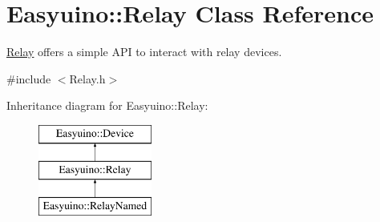 \hypertarget{class_easyuino_1_1_relay}{}\section{Easyuino\+:\+:Relay Class Reference}
\label{class_easyuino_1_1_relay}


\hyperlink{class_easyuino_1_1_relay}{Relay} offers a simple A\+PI to interact with relay devices.  




{\ttfamily \#include $<$Relay.\+h$>$}

Inheritance diagram for Easyuino\+:\+:Relay\+:\begin{figure}[H]
\begin{center}
\leavevmode
\includegraphics[height=3.000000cm]{class_easyuino_1_1_relay}
\end{center}
\end{figure}
